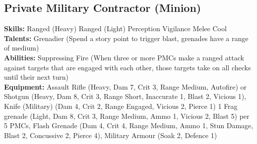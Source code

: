 \documentclass{article}
\begin{document}
\begin{multicols}{2}
{\subsection{Private Military Contractor (Minion)}
\begin{center}
\end{center}
\textbf{Skills:}
Ranged (Heavy)
Ranged (Light)
Perception
Vigilance
Melee
Cool
\\\textbf{Talents:}
Grenadier (Spend a story point to trigger blast, grenades have a range of medium)
\\\textbf{Abilities:}
Suppressing Fire (When three or more PMCs make a ranged attack against targets that are engaged with each other, those targets take \Black[1] on all checks until their next turn)
\\\textbf{Equipment:}
Assault Rifle (Heavy, Dam 7, Crit 3, Range Medium, Autofire) or Shotgun (Heavy, Dam 8, Crit 3, Range Short, Inaccurate 1, Blast 2, Vicious 1),
Knife (Military) (Dam 4, Crit 2, Range Engaged, Vicious 2, Pierce 1)
1 Frag grenade (Light, Dam 8, Crit 3, Range Medium, Ammo 1, Vicious 2, Blast 5) per 5 PMCs,
Flash Grenade (Dam 4, Crit 4, Range Medium, Ammo 1, Stun Damage, Blast 2, Concussive 2, Pierce 4), Military Armour (Soak 2, Defence 1)
}



\vbox{
}
\end{multicols}
\end{document}
